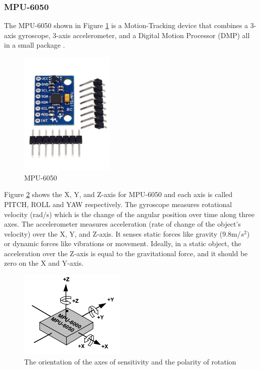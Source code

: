 \documentclass[12pt, a4paper, oneside]{report}
\begin{document}
\subsubsection{MPU-6050}
The MPU-6050 shown in Figure \ref{fig:mp1} is a Motion-Tracking device that combines a 3-axis gyroscope, 3-axis accelerometer, and a Digital Motion Processor (DMP) all in a small package \cite{zzs2}. 

\begin{figure}[H]
  \centering
  \includegraphics[width=0.4\textwidth]{pic/Navigation/5.jpg}
  \caption{MPU-6050}
  \label{fig:mp1}
\end{figure}

Figure \ref{fig:mp2} shows the X, Y, and Z-axis for MPU-6050 and each axis is called PITCH, ROLL and YAW respectively. The gyroscope measures rotational velocity (rad/s) which is the change of the angular position over time along three axes. The accelerometer measures acceleration (rate of change of the object’s velocity) over the X, Y, and Z-axis. It senses static forces like gravity (9.8m/$s^2$) or dynamic forces like vibrations or movement. Ideally, in a static object, the acceleration over the Z-axis is equal to the gravitational force, and it should be zero on the X and Y-axis.

\begin{figure}[H]
  \centering
  \includegraphics[width=0.45\textwidth]{pic/Navigation/6.png}
  \caption{The orientation of the axes of sensitivity and the polarity of rotation \cite{zzs2}}
  \label{fig:mp2}
\end{figure}
\end{document}
